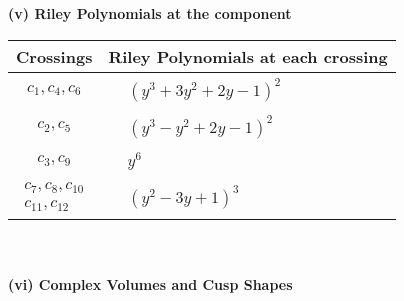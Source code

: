 \documentclass[1p]{elsarticle_modified}
\theoremstyle{definition}
\begin{document}
\newpage\renewcommand{\arraystretch}{1}
\flushleft \textbf{(v) Riley Polynomials at the component}\newline \\
\begin{tabular}{m{50pt}|m{274pt}}
Crossings & \hspace{64pt}Riley Polynomials at each crossing \\
\hline $$\begin{aligned}c_{1},c_{4},c_{6}\end{aligned}$$&$\begin{aligned}
&(y^3+3 y^2+2 y-1)^2
\end{aligned}$\\
\hline $$\begin{aligned}c_{2},c_{5}\end{aligned}$$&$\begin{aligned}
&(y^3- y^2+2 y-1)^2
\end{aligned}$\\
\hline $$\begin{aligned}c_{3},c_{9}\end{aligned}$$&$\begin{aligned}
&y^6
\end{aligned}$\\
\hline $$\begin{aligned}c_{7},c_{8},c_{10}\\c_{11},c_{12}\end{aligned}$$&$\begin{aligned}
&(y^2-3 y+1)^3
\end{aligned}$\\
\hline
\end{tabular}\\~\\
\newpage\flushleft \textbf{(vi) Complex Volumes and Cusp Shapes}
\end{document}
